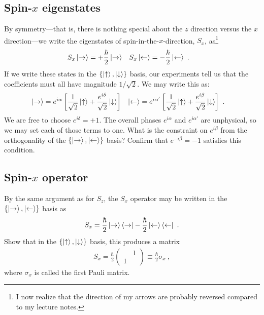 \subsection{\texorpdfstring{Spin-$x$ eigenstates}{Spin-x eignstates}}
By symmetry---that is, there is nothing special about the $z$ direction versus the $x$ direction---we write the eigenstates of spin-in-the-$x$-direction, $S_x$, as\footnote{I now realize that the direction of my arrows are probably reversed compared to my lecture notes.}
\begin{align}
    S_x\left|\rightarrow\right\rangle &= + \frac{\hbar}{2}\left|\rightarrow\right\rangle 
    &
    S_x\left|\leftarrow\right\rangle &= - \frac{\hbar}{2}\left|\leftarrow\right\rangle \ .
\end{align}
If we write these states in the $\{\left|\uparrow\right\rangle,\left|\downarrow\right\rangle\}$ basis, our experiments tell us that the coefficients must all have magnitude $1/\sqrt{2}$. We may write this as:
\begin{align}
    \left|\rightarrow\right\rangle &= 
    e^{i\alpha}\left[\frac{1}{\sqrt{2}}\left|\uparrow\right\rangle + \frac{e^{i\delta}}{\sqrt{2}}\left|\downarrow\right\rangle \right]
    &
    \left|\leftarrow\right\rangle &= 
    e^{i\alpha'}\left[\frac{1}{\sqrt{2}}\left|\uparrow\right\rangle + \frac{e^{i\beta}}{\sqrt{2}}\left|\downarrow\right\rangle \right]
    \ .
\end{align}
We are free to choose $e^{i\delta} = +1$. The overall phases $e^{i\alpha}$ and $e^{i\alpha'}$ are unphysical, so we may set each of those terms to one. What is the constraint on $e^{i\beta}$ from the orthogonality of the $\{\left|\rightarrow\right\rangle, \left|\leftarrow\right\rangle\}$ basis? Confirm that $e^{-i\beta}=-1$ satisfies this condition. 


\subsection{\texorpdfstring{Spin-$x$ operator}{Spin-x operator}}
By the same argument as for $S_z$, the $S_x$ operator may be written in the $\{\left|\rightarrow\right\rangle, \left|\leftarrow\right\rangle\}$ basis as
\begin{align}
    S_x = 
    \frac{\hbar}{2}\left|\rightarrow\right\rangle\left\langle\rightarrow\right|
    -
    \frac{\hbar}{2}\left|\leftarrow\right\rangle\left\langle\leftarrow\right| \ .
\end{align}
Show that in the $\{\left|\uparrow\right\rangle,\left|\downarrow\right\rangle\}$ basis, this produces a matrix
\begin{align}
    S_x = 
    \frac{\hbar}{2}
    \begin{pmatrix}
         & 1\\ 1 &  
    \end{pmatrix}
    \equiv \frac{\hbar}{2}  \sigma_x \ ,
\end{align}
where $\sigma_x$ is called the first Pauli matrix.



